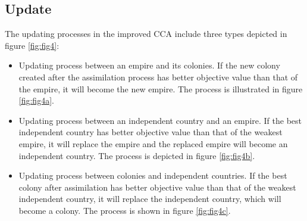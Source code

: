 \subsection{Update}
The updating processes in the improved CCA include three types depicted in figure \ref{fig:fig4}:
\begin{itemize}
	\item Updating process between an empire and its colonies. If the new colony created after the assimilation process has better objective value than that of the empire, it will become the new empire. The process is illustrated in figure \ref{fig:fig4a}.
	\item Updating process between an independent country and an empire. If the best independent country has better objective value than that of the weakest empire, it will replace the empire and the replaced empire will become an independent country.  The process is depicted in figure \ref{fig:fig4b}.
	\item Updating process between colonies and independent countries. If the best colony after assimilation has better objective value than that of the weakest independent country, it will replace the independent country, which will become a colony. The process is shown in figure \ref{fig:fig4c}.
\end{itemize}

